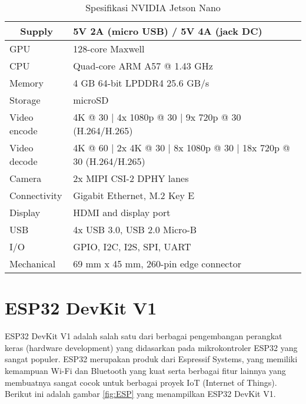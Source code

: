 \begin{table}[H]
	\caption{Spesifikasi NVIDIA Jetson Nano}
	\label{tab:jetson-nano}
	\centering
	\begin{tabular}{|l|l|}
		\hline
		\multicolumn{1}{|c|}{Supply} & 5V 2A (micro USB) / 5V 4A (jack DC)                                \\ \hline
		GPU                          & 128-core Maxwell                                                   \\ \hline
		CPU                          & Quad-core ARM A57 @ 1.43 GHz                                       \\ \hline
		Memory                       & 4 GB 64-bit LPDDR4 25.6 GB/s                                       \\ \hline
		Storage                      & microSD                                                            \\ \hline
		Video encode                 & 4K @ 30 | 4x 1080p @ 30 | 9x 720p @ 30 (H.264/H.265)               \\ \hline
		Video decode                 & 4K @ 60 | 2x 4K @ 30 | 8x 1080p @ 30 | 18x 720p @ 30 (H.264/H.265) \\ \hline
		Camera                       & 2x MIPI CSI-2 DPHY lanes                                           \\ \hline
		Connectivity                 & Gigabit Ethernet, M.2 Key E                                        \\ \hline
		Display                      & HDMI and display port                                              \\ \hline
		USB                          & 4x USB 3.0, USB 2.0 Micro-B                                        \\ \hline
		I/O                          & GPIO, I2C, I2S, SPI, UART                                          \\ \hline
		Mechanical                   & 69 mm x 45 mm, 260-pin edge connector                              \\ \hline
	\end{tabular}
\end{table}

\section{ESP32 DevKit V1}
ESP32 DevKit V1 adalah salah satu dari berbagai pengembangan perangkat keras (hardware development) yang didasarkan pada mikrokontroler ESP32 yang sangat populer. ESP32 merupakan produk dari Espressif Systems, yang memiliki kemampuan Wi-Fi dan Bluetooth yang kuat serta berbagai fitur lainnya yang membuatnya sangat cocok untuk berbagai proyek IoT (Internet of Things). Berikut ini adalah gambar \cref{fig:ESP} yang menampilkan ESP32 DevKit V1.

